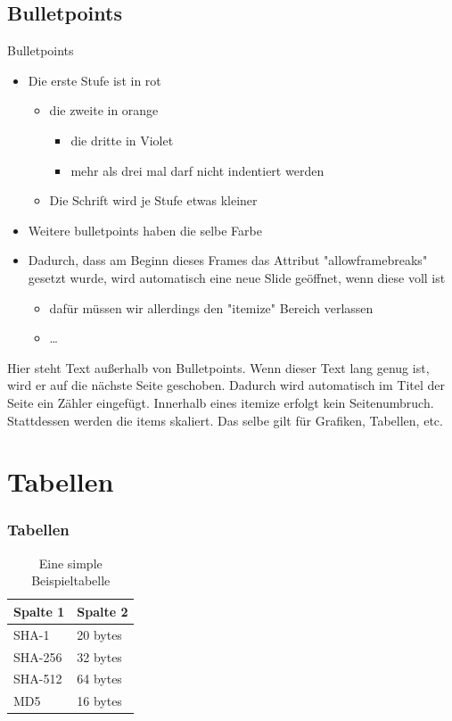 \documentclass{beamer}
\begin{document}
\subsection{Bulletpoints}\label{sec:itemize}
\begin{frame}[allowframebreaks]{Bulletpoints}
    \begin{itemize}
        \item Die erste Stufe ist in rot
        \begin{itemize}
            \item die zweite in orange
            \begin{itemize}
                \item die dritte in Violet
                \item mehr als drei mal darf nicht indentiert werden
            \end{itemize}    
            \item Die Schrift wird je Stufe etwas kleiner
        \end{itemize}    
        \item Weitere bulletpoints haben die selbe Farbe
        \item Dadurch, dass am Beginn dieses Frames das Attribut "allowframebreaks" gesetzt wurde, wird automatisch eine neue Slide geöffnet, wenn diese voll ist
        \begin{itemize}
            \item dafür müssen wir allerdings den "itemize" Bereich verlassen
            \item \dots
        \end{itemize}
    \end{itemize}
    Hier steht Text außerhalb von Bulletpoints. Wenn dieser Text lang genug ist, wird er auf die nächste Seite geschoben.
    Dadurch wird automatisch im Titel der Seite ein Zähler eingefügt. 
    Innerhalb eines itemize erfolgt kein Seitenumbruch. Stattdessen werden die items skaliert. Das selbe gilt für Grafiken, Tabellen, etc.
\end{frame}

\section{Tabellen}\label{sec:tables}
\begin{frame} 
    \frametitle{Tabellen} 
    \begin{table}[ht]
        \centering
        \begin{tabular}{l | l }
          \textbf{Spalte 1}   & \textbf{Spalte 2} \\
          \hline
          SHA-1 &  20 bytes \\ 
          \hline
          SHA-256 &  32 bytes \\ 
          \hline
          SHA-512 &  64 bytes \\ 
          \hline
          MD5 &  16 bytes \\ 
        \end{tabular}
        \caption{\label{tab:example_table} Eine simple Beispieltabelle}
    \end{table}

\end{frame}
\end{document}
